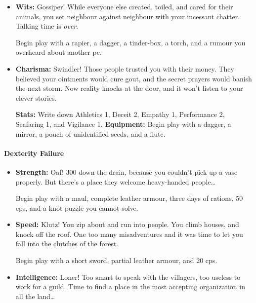\begin{multicols}{2}
\begin{itemize}
  \textbf{Stats:}
  Write down Academics 2, Performance 1, Vigilance 1, and the Rituals Knack.
  Then fill in Earth 1, Fire 1.

  \textbf{Equipment:}
  Begin play with a piece of chalk, a tinder-box, a mirror, 50' of rope, writing equipment, and four letters you wrote (still undelivered).
  \item
  \textbf{Wits:}
  Gossiper!
  While everyone else created, toiled, and cared for their animals, you set neighbour against neighbour with your incessant chatter.
  Talking time is \emph{over}.

  Begin play with a rapier, a dagger, a tinder-box, a torch, and a rumour you overheard about another \gls{pc}.
  \item
  \textbf{Charisma:}
  Swindler!
  Those people trusted you with their money.
  They believed your ointments would cure gout, and the secret prayers would banish the next storm.
  Now reality knocks at the door, and it won't listen to your clever stories.

  \textbf{Stats:}
  Write down Athletics 1, Deceit 2, Empathy 1, Performance 2, Seafaring 1, and Vigilance 1.
  \textbf{Equipment:}
  Begin play with a dagger, a mirror, a pouch of unidentified seeds, and a flute.

\end{itemize}

\paragraph{Dexterity Failure}

\begin{itemize}

  \item
  \textbf{Strength:}
  Oaf!
  300  down the drain, because you couldn't pick up a vase properly.
  But there's a place they welcome heavy-handed people\ldots

  Begin play with a maul, complete leather armour, three days of rations, 50 \glspl{cp}, and a knot-puzzle you cannot solve.

  \item
  \textbf{Speed:}
  Klutz!
  You zip about and run into people.
  You climb houses, and knock off the roof.
  One too many misadventures and it was time to let you fall into the clutches of the forest.

  Begin play with a short sword, partial leather armour, and 20 \glspl{cp}.
  \item
  \textbf{Intelligence:}
  Loner!
  Too smart to speak with the villagers, too useless to work for a guild.
  Time to find a place in the most accepting organization in all the land\ldots


\end{itemize}
\end{multicols}
